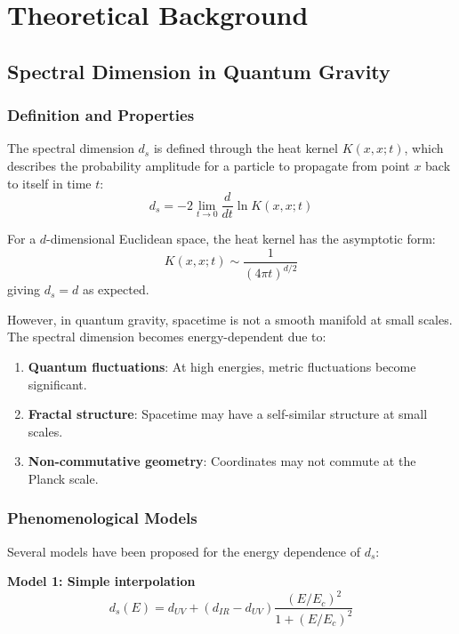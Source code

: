\documentclass[UTF8]{ctex}\n\documentclass[12pt,a4paper]{article}
\begin{document}
\section{Theoretical Background}
\label{sec:theory}

\subsection{Spectral Dimension in Quantum Gravity}

\subsubsection{Definition and Properties}

The spectral dimension $d_s$ is defined through the heat kernel $K(x,x;t)$, which describes the probability amplitude for a particle to propagate from point $x$ back to itself in time $t$:
\begin{equation}
    d_s = -2 \lim_{t \to 0} \frac{d}{dt} \ln K(x,x;t)
\end{equation}

For a $d$-dimensional Euclidean space, the heat kernel has the asymptotic form:
\begin{equation}
    K(x,x;t) \sim \frac{1}{(4\pi t)^{d/2}}
\end{equation}
giving $d_s = d$ as expected.

However, in quantum gravity, spacetime is not a smooth manifold at small scales. The spectral dimension becomes energy-dependent due to:
\begin{enumerate}
    \item \textbf{Quantum fluctuations}: At high energies, metric fluctuations become significant.
    \item \textbf{Fractal structure}: Spacetime may have a self-similar structure at small scales.
    \item \textbf{Non-commutative geometry}: Coordinates may not commute at the Planck scale.
\end{enumerate}

\subsubsection{Phenomenological Models}

Several models have been proposed for the energy dependence of $d_s$:

\textbf{Model 1: Simple interpolation}
\begin{equation}
    d_s(E) = d_{UV} + (d_{IR} - d_{UV}) \frac{(E/E_c)^2}{1+(E/E_c)^2}
\end{equation}
\end{document}
